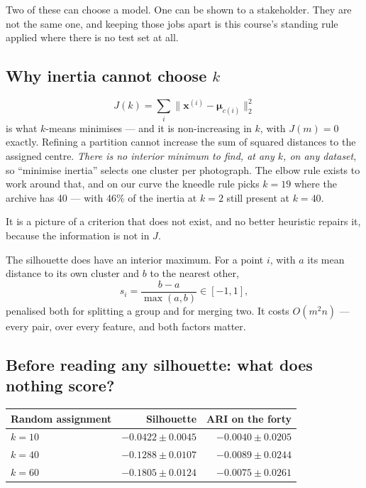 \documentclass[11pt,a4paper]{article}
\begin{document}
Two of these can choose a model. One can be shown to a stakeholder. They are
not the same one, and keeping those jobs apart is this course's standing rule
applied where there is no test set at all.

\subsection{Why inertia cannot choose $k$}

\[ J(k) = \sum_i \bigl\lVert\mathbf{x}^{(i)}
          - \boldsymbol\mu_{c(i)}\bigr\rVert_2^2 \]
is what $k$-means minimises --- and it is non-increasing in $k$, with
$J(m) = 0$ exactly. Refining a partition cannot increase the sum of squared
distances to the assigned centre. \emph{There is no interior minimum to find,
at any $k$, on any dataset}, so ``minimise inertia'' selects one cluster per
photograph. The elbow rule exists to work around that, and on our curve the
kneedle rule picks $k = 19$ where the archive has 40 --- with 46\% of the
inertia at $k=2$ still present at $k=40$.

\begin{keybox}[title={The elbow is not a criterion}]
It is a picture of a criterion that does not exist, and no better heuristic
repairs it, because the information is not in $J$.
\end{keybox}

The silhouette does have an interior maximum. For a point $i$, with $a$ its
mean distance to its own cluster and $b$ to the nearest other,
\[ s_i = \frac{b-a}{\max(a,b)} \in [-1,1], \]
penalised both for splitting a group and for merging two. It costs $O(m^2n)$
--- every pair, over every feature, and both factors matter.

\subsection{Before reading any silhouette: what does nothing score?}

\begin{center}
\small
\begin{tabular}{lrr}
\toprule
\textbf{Random assignment} & \textbf{Silhouette} & \textbf{ARI on the forty} \\
\midrule
$k = 10$ & $-0.0422 \pm 0.0045$ & $-0.0040 \pm 0.0205$ \\
$k = 40$ & $-0.1288 \pm 0.0107$ & $-0.0089 \pm 0.0244$ \\
$k = 60$ & $-0.1805 \pm 0.0124$ & $-0.0075 \pm 0.0261$ \\
\bottomrule
\end{tabular}
\end{center}
\end{document}
